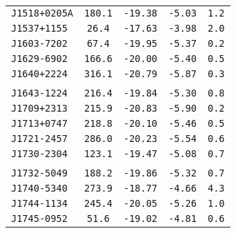 \begin{longtable}{ l | c | c | c | c }
\scriptsize{\tt{J1518+0205A}} & \scriptsize{\tt{180.1}} & \scriptsize{\tt{-19.38}} &
\scriptsize{\tt{-5.03}} & \scriptsize{\tt{1.2}} \\[-16pt]
\scriptsize{\tt{J1537+1155}} & \scriptsize{\tt{26.4}} & \scriptsize{\tt{-17.63}} &
\scriptsize{\tt{-3.98}} & \scriptsize{\tt{2.0}} \\[-16pt]
\scriptsize{\tt{J1603-7202}} & \scriptsize{\tt{67.4}} & \scriptsize{\tt{-19.95}} &
\scriptsize{\tt{-5.37}} & \scriptsize{\tt{0.2}} \\[-16pt]
\scriptsize{\tt{J1629-6902}} & \scriptsize{\tt{166.6}} & \scriptsize{\tt{-20.00}} &
\scriptsize{\tt{-5.40}} & \scriptsize{\tt{0.5}} \\[-16pt]
\scriptsize{\tt{J1640+2224}} & \scriptsize{\tt{316.1}} & \scriptsize{\tt{-20.79}} &
\scriptsize{\tt{-5.87}} & \scriptsize{\tt{0.3}} \\[-16pt]
\\[-20pt] 
\scriptsize{\tt{J1643-1224}} & \scriptsize{\tt{216.4}} & \scriptsize{\tt{-19.84}} &
\scriptsize{\tt{-5.30}} & \scriptsize{\tt{0.8}} \\[-16pt]
\scriptsize{\tt{J1709+2313}} & \scriptsize{\tt{215.9}} & \scriptsize{\tt{-20.83}} &
\scriptsize{\tt{-5.90}} & \scriptsize{\tt{0.2}} \\[-16pt]
\scriptsize{\tt{J1713+0747}} & \scriptsize{\tt{218.8}} & \scriptsize{\tt{-20.10}} &
\scriptsize{\tt{-5.46}} & \scriptsize{\tt{0.5}} \\[-16pt]
\scriptsize{\tt{J1721-2457}} & \scriptsize{\tt{286.0}} & \scriptsize{\tt{-20.23}} &
\scriptsize{\tt{-5.54}} & \scriptsize{\tt{0.6}} \\[-16pt]
\scriptsize{\tt{J1730-2304}} & \scriptsize{\tt{123.1}} & \scriptsize{\tt{-19.47}} &
\scriptsize{\tt{-5.08}} & \scriptsize{\tt{0.7}} \\[-16pt]
\\[-20pt] 
\scriptsize{\tt{J1732-5049}} & \scriptsize{\tt{188.2}} & \scriptsize{\tt{-19.86}} &
\scriptsize{\tt{-5.32}} & \scriptsize{\tt{0.7}} \\[-16pt]
\scriptsize{\tt{J1740-5340}} & \scriptsize{\tt{273.9}} & \scriptsize{\tt{-18.77}} &
\scriptsize{\tt{-4.66}} & \scriptsize{\tt{4.3}} \\[-16pt]
\scriptsize{\tt{J1744-1134}} & \scriptsize{\tt{245.4}} & \scriptsize{\tt{-20.05}} &
\scriptsize{\tt{-5.26}} & \scriptsize{\tt{1.0}} \\[-16pt]
\scriptsize{\tt{J1745-0952}} & \scriptsize{\tt{51.6}} & \scriptsize{\tt{-19.02}} &
\scriptsize{\tt{-4.81}} & \scriptsize{\tt{0.6}} \\[-16pt]

\end{longtable}
